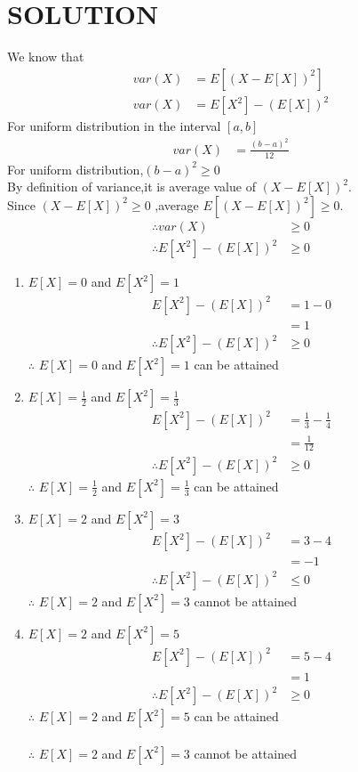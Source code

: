 \documentclass[journal,12pt,twocolumn]{IEEEtran}
\begin{document}
\section*{SOLUTION}
We know that
\begin{align}
var(X)&=E[(X-E[X])^2] \label{eq:1} \\
var(X)&=E[X^2]-(E[X])^2 \label{1}
\end{align}
For uniform distribution in the interval $[a,b]$
\begin{align}
var(X) &= \frac{{(b-a)}^2}{12} \label{eq:2}
\end{align}
For uniform distribution,$(b-a)^2 \geq 0$\\
By definition of variance,it is average value of ${(X-E[X])}^2$.\\
Since ${(X-E[X])}^2 \geq 0$ ,average $E[(X-E[X])^2] \geq 0$.
\begin{align}
\therefore var(X) & \geq 0 \label{2} \\
\therefore E[X^2]-(E[X])^2 & \geq 0 \label{3}
\end{align}
\begin{enumerate}
\item  $E[X]=0$ and $E[X^2]=1$
\begin{align}
E[X^2]-(E[X])^2 &=1 - 0\\
&=1\\
\therefore E[X^2]-(E[X])^2 &\geq 0
\end{align}
$\therefore$ $E[X]=0$ and $E[X^2]=1$ can be attained \\
\item  $E[X]=\frac{1}{2}$ and $E[X^2] =\frac{1}{3}$
\begin{align}
E[X^2]-(E[X])^2 &=\frac{1}{3} - \frac{1}{4}\\
&=\frac{1}{12}\\
\therefore E[X^2]-(E[X])^2 &\geq 0
\end{align}
$\therefore$ $E[X]=\frac{1}{2}$ and $E[X^2]=\frac{1}{3}$ can be attained \\
\item  $E[X]=2$ and $E[X^2]=3$
\begin{align}
E[X^2]-(E[X])^2 &=3 - 4\\
&=-1\\
\therefore E[X^2]-(E[X])^2 &\leq 0
\end{align}
$\therefore$ $E[X]=2$ and $E[X^2]=3$ cannot be attained \\
\item  $E[X]=2$ and $E[X^2]=5$
\begin{align}
E[X^2]-(E[X])^2 &=5 - 4\\
&=1\\
\therefore E[X^2]-(E[X])^2 &\geq 0
\end{align}
$\therefore$ $E[X]=2$ and $E[X^2]=5$ can be attained\\ \\
$\therefore$ $E[X]=2$ and $E[X^2]=3$ cannot be attained\\
\end{enumerate}
\end{document}
